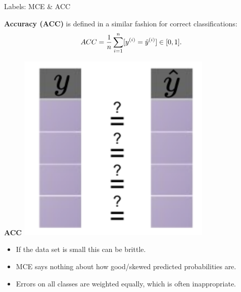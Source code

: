 \documentclass[11pt,compress,t,notes=noshow, xcolor=table]{beamer}
\begin{document}
\begin{vbframe}{Labels: MCE \& ACC}
\begin{minipage}[t]{0.75\textwidth} 
  \small
  \textbf{Accuracy (ACC)} is defined in a similar fashion for correct 
  classifications:
  $$ ACC = \frac{1}{n} \sum\limits_{i=1}^n [y^{(i)} = \hat{y}^{(i)}] \in [0, 1]. $$
\end{minipage}%
\begin{minipage}[t]{0.25\textwidth}
  \centering
  \begin{center}
    \textbf{ACC}
    \includegraphics[width=0.7\textwidth]
    {figure_man/eval-classif-loss-compare.pdf}
  \end{center}
\end{minipage}

\lz

\begin{itemize}
  \small
  \item If the data set is small this can be brittle.
  \item MCE says nothing about how good/skewed predicted probabilities are.
  \item Errors on all classes are weighted equally, which is often 
  inappropriate.
\end{itemize}

\end{vbframe}

\end{document}

